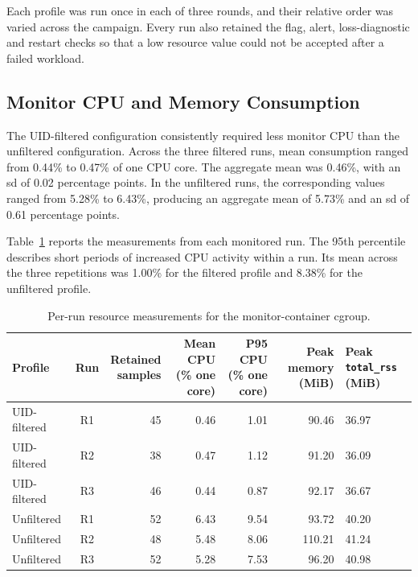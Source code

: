 Each profile was run once in each of three rounds, and their relative order was
varied across the campaign. Every run also retained the 
flag, alert, loss-diagnostic and restart checks so that a low resource value 
could not be accepted after a failed workload.

\subsection{Monitor CPU and Memory Consumption}
\label{subsec:evaluation-monitor-resources}

The UID-filtered configuration consistently required less monitor CPU than the
unfiltered configuration. Across the three filtered runs, mean consumption
ranged from 0.44\% to 0.47\% of one CPU core. The aggregate mean was 0.46\%,
with an \gls{sd} of 0.02 percentage points. In the unfiltered runs, the
corresponding values ranged from 5.28\% to 6.43\%, producing an aggregate mean
of 5.73\% and an \gls{sd} of 0.61 percentage points.

Table~\ref{tab:evaluation-performance-profiles} reports the measurements from
each monitored run. The 95th percentile describes short periods of increased
CPU activity within a run. Its mean across the three repetitions was 1.00\%
for the filtered profile and 8.38\% for the unfiltered profile.

\begin{table}[H]
    \centering
    \footnotesize
    \setlength{\tabcolsep}{4pt}
    \renewcommand{\arraystretch}{1.14}
    \begin{tabularx}{\textwidth}{@{}l c r r r r X@{}}
        \toprule
        \textbf{Profile} & \textbf{Run} &
        \shortstack{\textbf{Retained}\\\textbf{samples}} &
        \shortstack{\textbf{Mean CPU}\\\textbf{(\% one core)}} &
        \shortstack{\textbf{P95 CPU}\\\textbf{(\% one core)}} &
        \shortstack{\textbf{Peak memory}\\\textbf{(MiB)}} &
        \shortstack{\textbf{Peak \texttt{total\_rss}}\\\textbf{(MiB)}} \\
        \midrule
        UID-filtered & R1 & 45 & 0.46 & 1.01 & 90.46 & 36.97 \\
        UID-filtered & R2 & 38 & 0.47 & 1.12 & 91.20 & 36.09 \\
        UID-filtered & R3 & 46 & 0.44 & 0.87 & 92.17 & 36.67 \\
        \addlinespace
        Unfiltered & R1 & 52 & 6.43 & 9.54 & 93.72 & 40.20 \\
        Unfiltered & R2 & 48 & 5.48 & 8.06 & 110.21 & 41.24 \\
        Unfiltered & R3 & 52 & 5.28 & 7.53 & 96.20 & 40.98 \\
        \bottomrule
    \end{tabularx}
    \caption{Per-run resource measurements for the monitor-container cgroup.}
    \label{tab:evaluation-performance-profiles}
\end{table}

